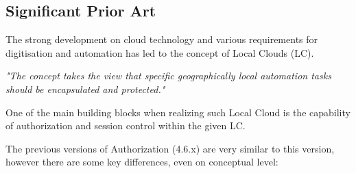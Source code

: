 \documentclass[a4paper]{arrowhead}
\begin{document}
\subsection{Significant Prior Art}
\label{sec:prior_art}

The strong development on cloud technology and various requirements for digitisation and automation has led to the concept of Local Clouds (LC).

\textit{"The concept takes the view that specific geographically local automation tasks should be encapsulated and protected."} \cite{jerker2017localclouds}

One of the main building blocks when realizing such Local Cloud is the capability of authorization and session control within the given LC.

The previous versions of Authorization (4.6.x) are very similar to this version, however there are some key differences, even on conceptual level:
\end{document}
